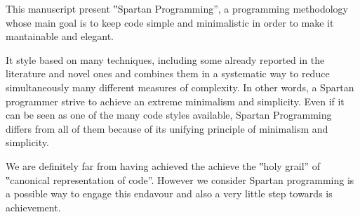 
This manuscript present ‟Spartan Programming”, a programming methodology
whose main goal is to keep code simple and minimalistic in order to make it
mantainable and elegant.

It style based on many techniques, including some already reported in the literature and novel
ones and combines them in a systematic way to reduce simultaneously many
different measures of complexity. In other words, a Spartan programmer strive
to achieve an extreme minimalism and simplicity. Even if it can be seen as one
of the many code styles available, Spartan Programming differs from all of them
because of its unifying principle of minimalism and simplicity.

We are definitely far from having achieved the achieve the ‟holy grail” of
‟canonical representation of code”.
However we consider Spartan programming is a possible way to engage this endavour and
also a very little step towards is achievement.

